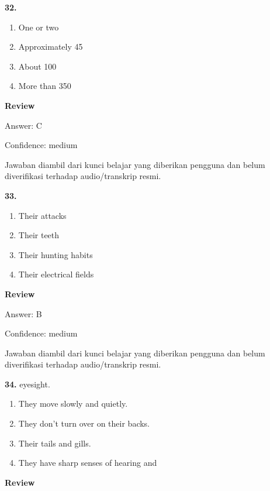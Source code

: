 \documentclass[12pt]{article}
\begin{document}
\noindent\textbf{32.}
\begin{enumerate}[label=(\Alph*),leftmargin=*,itemsep=0.2em]
\item One or two
\item Approximately 45
\item About 100
\item More than 350
\end{enumerate}
\par
\begingroup
\setlength{\parskip}{0pt}
\setlength{\parindent}{0pt}
\textbf{Review}\par
Answer: C\par
Confidence: medium\par
Jawaban diambil dari kunci belajar yang diberikan pengguna dan belum diverifikasi terhadap audio/transkrip resmi.\par
\endgroup
\par
\vspace{0.25\baselineskip}
\noindent\textbf{33.}
\begin{enumerate}[label=(\Alph*),leftmargin=*,itemsep=0.2em]
\item Their attacks
\item Their teeth
\item Their hunting habits
\item Their electrical fields
\end{enumerate}
\par
\begingroup
\setlength{\parskip}{0pt}
\setlength{\parindent}{0pt}
\textbf{Review}\par
Answer: B\par
Confidence: medium\par
Jawaban diambil dari kunci belajar yang diberikan pengguna dan belum diverifikasi terhadap audio/transkrip resmi.\par
\endgroup
\par
\vspace{0.25\baselineskip}
\noindent\textbf{34.} eyesight.
\begin{enumerate}[label=(\Alph*),leftmargin=*,itemsep=0.2em]
\item They move slowly and quietly.
\item They don't turn over on their backs.
\item Their tails and gills.
\item They have sharp senses of hearing and
\end{enumerate}
\par
\begingroup
\setlength{\parskip}{0pt}
\setlength{\parindent}{0pt}
\textbf{Review}\par
\end{document}

